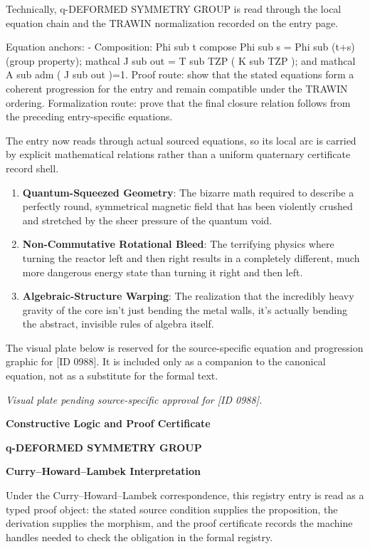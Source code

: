 Technically, q-DEFORMED SYMMETRY GROUP is read through the local equation chain and the TRAWIN normalization recorded on the entry page.

Equation anchors: - Composition: Phi sub t compose Phi sub s = Phi sub (t+s) (group property); mathcal J sub out = T sub TZP ( K sub TZP ); and mathcal A sub adm ( J sub out )=1. Proof route: show that the stated equations form a coherent progression for the entry and remain compatible under the TRAWIN ordering. Formalization route: prove that the final closure relation follows from the preceding entry-specific equations.

The entry now reads through actual sourced equations, so its local arc is carried by explicit mathematical relations rather than a uniform quaternary certificate record shell.
\endgroup

\begin{enumerate}[leftmargin=1.6em,itemsep=6pt,topsep=4pt]
\item \textbf{Quantum-Squeezed Geometry}: The bizarre math required to describe a perfectly round, symmetrical magnetic field that has been violently crushed and stretched by the sheer pressure of the quantum void.
\item \textbf{Non-Commutative Rotational Bleed}: The terrifying physics where turning the reactor left and then right results in a completely different, much more dangerous energy state than turning it right and then left.
\item \textbf{Algebraic-Structure Warping}: The realization that the incredibly heavy gravity of the core isn't just bending the metal walls, it's actually bending the abstract, invisible rules of algebra itself.
\end{enumerate}

\begingroup\footnotesize\sloppy
The visual plate below is reserved for the source-specific equation and progression graphic for [ID 0988]. It is included only as a companion to the canonical equation, not as a substitute for the formal text.
\par\endgroup
\begingroup\footnotesize\itshape
Visual plate pending source-specific approval for [ID 0988].
\par\endgroup

\clearpage
\begingroup\tzpsupportsetup
\noindent\textbf{\fontsize{10.8pt}{12.8pt}\selectfont [ID 0988] Constructive Logic and Proof Certificate}\par
\noindent\textbf{\fontsize{10pt}{12pt}\selectfont q-DEFORMED SYMMETRY GROUP}\par
\vspace{0.45em}
\begingroup
\footnotesize
\setlength{\parskip}{0.22em}
\setlength{\parindent}{0pt}
\noindent\textbf{Curry--Howard--Lambek Interpretation}\par
Under the Curry--Howard--Lambek correspondence, this registry entry is read as a typed proof
object: the stated source condition supplies the proposition, the derivation supplies the
morphism, and the proof certificate records the machine handles needed to check the obligation
in the formal registry.

